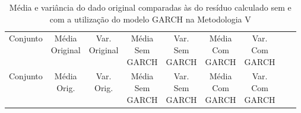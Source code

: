 \clearpage

\begin{center}
\begin{longtable}{ccccccccc}
\toprule
\rowcolor{white}
\caption[Metodologia V: dados estatísticos]{Média e variância do dado original
comparadas às do resíduo calculado sem e com a utilização do modelo GARCH na
Metodologia V} \label{tab:DadosEstatisticosMet5}\\
\midrule
    Conjunto & \specialcell{Média\\Original} &
    \specialcell{Var.\\Original} & \specialcell{Média\\Sem\\GARCH} &
    \specialcell{Var.\\Sem\\GARCH} & \specialcell{Média\\Com\\GARCH}&
    \specialcell{Var.\\Com\\GARCH} \\

\midrule
\endfirsthead 
\midrule
\rowcolor{white}
    Conjunto & \specialcell{Média\\Orig.} &
    \specialcell{Var.\\Orig.} & \specialcell{Média\\Sem\\GARCH} &
    \specialcell{Var.\\Sem\\GARCH} & \specialcell{Média\\Com\\GARCH}&
    \specialcell{Var.\\Com\\GARCH} \\


\end{longtable}
\end{center}
